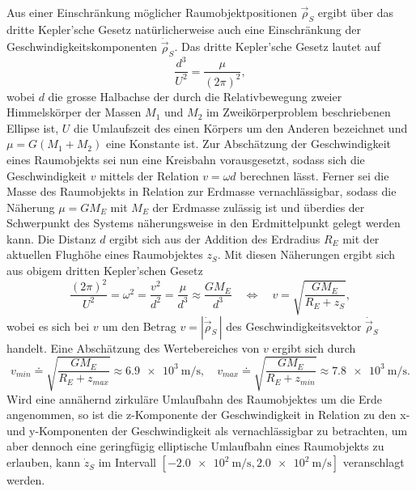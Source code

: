 \documentclass[a4paper,12pt]{article}
\numberwithin{equation}{section}
\begin{document}
Aus einer Einschränkung möglicher Raumobjektpositionen $\vec{\rho}_S$ ergibt über das dritte Kepler'sche Gesetz natürlicherweise auch eine Einschränkung der Geschwindigkeitskomponenten $\dot{\vec{\rho}}_S$. Das dritte Kepler'sche Gesetz lautet auf \begin{equation}
\frac{d^3}{U^2} = \frac{\mu}{(2\pi)^2},
\end{equation} wobei $d$ die grosse Halbachse der durch die Relativbewegung zweier Himmelskörper der Massen $M_1$ und $M_2$ im Zweikörperproblem beschriebenen Ellipse ist, $U$ die Umlaufszeit des einen Körpers um den Anderen bezeichnet und $\mu = G(M_1+M_2)$ eine Konstante ist. Zur Abschätzung der Geschwindigkeit eines Raumobjekts sei nun eine Kreisbahn vorausgesetzt, sodass sich die Geschwindigkeit $v$ mittels der Relation $v = \omega d$ berechnen lässt. Ferner sei die Masse des Raumobjekts in Relation zur Erdmasse vernachlässigbar, sodass die Näherung $\mu = GM_E$ mit $M_E$ der Erdmasse zulässig ist und überdies der Schwerpunkt des Systems näherungsweise in den Erdmittelpunkt gelegt werden kann. Die Distanz $d$ ergibt sich aus der Addition des Erdradius $R_E$ mit der aktuellen Flughöhe eines Raumobjektes $z_S$. Mit diesen Näherungen ergibt sich aus obigem dritten Kepler'schen Gesetz \begin{equation}
\frac{(2\pi)^2}{U^2} = \omega^2 = \frac{v^2}{d^2} = \frac{\mu}{d^3} \approx \frac{GM_E}{d^3} \quad \Leftrightarrow \quad v = \sqrt{\frac{GM_E}{R_E + z_S}},
\end{equation} wobei es sich bei $v$ um den Betrag $v = |\dot{\vec{\rho}}_S\,|$ des Geschwindigkeitsvektor $\dot{\vec{\rho}}_S$ handelt. Eine Abschätzung des Wertebereiches von $v$ ergibt sich durch \begin{equation}
v_{min} \doteq \sqrt{\frac{GM_E}{R_E + z_{max}}} \approx \SI{6.9e3}{\meter\per\second} , \quad v_{max} \doteq \sqrt{\frac{GM_E}{R_E + z_{min}}} \approx \SI{7.8e3}{\meter\per\second}.
\end{equation} Wird eine annähernd zirkuläre Umlaufbahn des Raumobjektes um die Erde angenommen, so ist die z-Komponente der Geschwindigkeit in Relation zu den x- und y-Komponenten der Geschwindigkeit als vernachlässigbar zu betrachten, um aber dennoch eine geringfügig elliptische Umlaufbahn eines Raumobjekts zu erlauben, kann $\dot{z}_S$ im Intervall $[\SI{-2.0e2}{\meter\per\second},\SI{2.0e2}{\meter\per\second}]$ veranschlagt werden.
\end{document}
